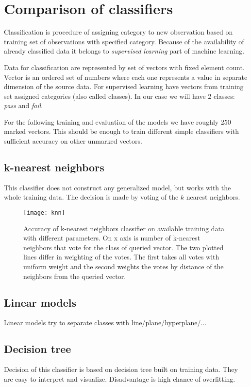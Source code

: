 \section{Comparison of classifiers}
Classification is procedure of assigning category to new observation based on
training set of observations with specified category. Because of the
availability of already classified data it belongs to \emph{supervised learning}
part of machine learning.

Data for classification are represented by set of vectors with fixed element
count. Vector is an ordered set of numbers where each one represents a value in
separate dimension of the source data. For supervised learning have vectors from
training set assigned categories (also called classes). In our case we will have
2 classes: \emph{pass} and \emph{fail}.

For the following training and evaluation of the models we have roughly 250
marked vectors. This should be enough to train different simple classifiers with
sufficient accuracy on other unmarked vectors.

\subsection{k-nearest neighbors}
This classifier does not construct any generalized model, but works with the
whole training data. The decision is made by voting of the $k$ nearest
neighbors.

\begin{figure}
  \centering
  \texttt{[image: knn]}
  \caption{Accuracy of k-nearest neighbors classifier on available training
    data with different parameters. On x axis is number of k-nearest neighbors
    that vote for the class of queried vector. The two plotted lines differ in
    weighting of the votes. The first takes all votes with uniform weight and
    the second weights the votes by distance of the neighbors from the queried
    vector.}
  \label{fig:knn}
\end{figure}

\subsection{Linear models}
Linear models try to separate classes with line/plane/hyperplane/...

\subsection{Decision tree}
Decision of this classifier is based on decision tree built on training data.
They are easy to interpret and visualize. Disadvantage is high chance of
overfitting.

